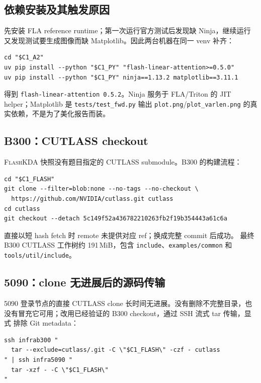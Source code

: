\documentclass[11pt,a4paper,fontset=none]{ctexart}
\newcommand{\FlashKDA}{\textsc{FlashKDA}}
\newcommand{\code}[1]{\texttt{#1}}
\begin{document}
\subsection{依赖安装及其触发原因}

先安装 FLA reference runtime；第一次运行官方测试后发现缺 Ninja，继续运行
又发现测试要生成图像而缺 Matplotlib。因此两台机器在同一 venv 补齐：

\begin{lstlisting}
cd "$C1_A2"
uv pip install --python "$C1_PY" "flash-linear-attention>=0.5.0"
uv pip install --python "$C1_PY" ninja==1.13.2 matplotlib==3.11.1
\end{lstlisting}

得到 \code{flash-linear-attention 0.5.2}。Ninja 服务于 FLA/Triton 的
JIT helper；Matplotlib 是 \code{tests/test\_fwd.py} 输出
\code{plot.png}/\code{plot\_varlen.png} 的真实依赖，不是为了美化报告而装。

\subsection{B300：CUTLASS checkout}

\FlashKDA{} 快照没有题目指定的 CUTLASS submodule。B300 的构建流程：

\begin{lstlisting}
cd "$C1_FLASH"
git clone --filter=blob:none --no-tags --no-checkout \
  https://github.com/NVIDIA/cutlass.git cutlass
cd cutlass
git checkout --detach 5c149f52a436782210263fb2f19b354443a61c6a
\end{lstlisting}

直接以短 hash fetch 时 remote 未提供对应 ref；换成完整 commit 后成功。
最终 B300 CUTLASS 工作树约 191\,MiB，包含
\code{include}、\code{examples/common} 和 \code{tools/util/include}。

\subsection{5090：clone 无进展后的源码传输}

5090 登录节点的直接 CUTLASS clone 长时间无进展。没有删除不完整目录，也
没有冒充它可用；改用已经验证的 B300 checkout，通过 SSH 流式 tar 传输，显式
排除 Git metadata：

\begin{lstlisting}
ssh infrab300 "
  tar --exclude=cutlass/.git -C \"$C1_FLASH\" -czf - cutlass
" | ssh infra5090 "
  tar -xzf - -C \"$C1_FLASH\"
"
\end{lstlisting}
\end{document}
